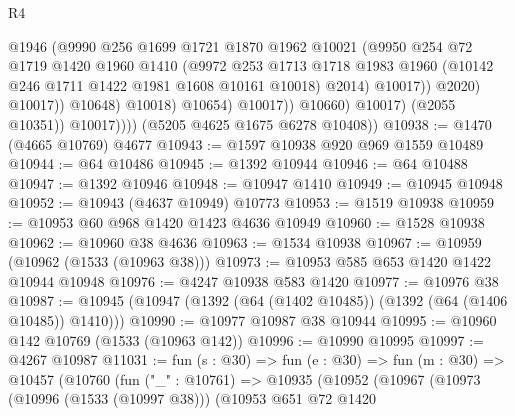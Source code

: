 \begin{lexlean}{R4}
\begin{coremodule}
                                    @1946
                                    (@9990
                                      @256
                                      @1699
                                      @1721
                                      @1870
                                      @1962
                                      @10021
                                      (@9950
                                        @254
                                        @72
                                        @1719
                                        @1420
                                        @1960
                                        @1410
                                        (@9972
                                          @253
                                          @1713
                                          @1718
                                          @1983
                                          @1960
                                          (@10142 @246 @1711 @1422 @1981 @1608 @10161 @10018)
                                          @2014)
                                        @10017))
                                    @2020)
                                  @10017))
                              @10648)
                            @10018)
                          @10654)
                        @10017))
                    @10660)
                  @10017)
                (@2055 @10351))
              @10017))))
      (@5205 @4625 @1675 @6278 @10408))
@10938 := @1470 (@4665 @10769) @4677
@10943 := @1597 @10938 @920 @969 @1559 @10489
@10944 := @64 @10486
@10945 := @1392 @10944
@10946 := @64 @10488
@10947 := @1392 @10946
@10948 := @10947 @1410
@10949 := @10945 @10948
@10952 := @10943 (@4637 @10949) @10773
@10953 := @1519 @10938
@10959 := @10953 @60 @968 @1420 @1423 @4636 @10949
@10960 := @1528 @10938
@10962 := @10960 @38 @4636
@10963 := @1534 @10938
@10967 := @10959 (@10962 (@1533 (@10963 @38)))
@10973 := @10953 @585 @653 @1420 @1422 @10944 @10948
@10976 := @4247 @10938 @583 @1420
@10977 := @10976 @38
@10987 := @10945 (@10947 (@1392 (@64 (@1402 @10485)) (@1392 (@64 (@1406 @10485)) @1410)))
@10990 := @10977 @10987 @38 @10944
@10995 := @10960 @142 @10769 (@1533 (@10963 @142))
@10996 := @10990 @10995
@10997 := @4267 @10987
@11031 := fun (s : @30) =>
  fun (e : @30) =>
  fun (m : @30) =>
  @10457
    (@10760
      (fun ("_" : @10761) =>
      @10935
        (@10952
          (@10967
            (@10973
              (@10996 (@1533 (@10997 @38)))
              (@10953
                @651
                @72
                @1420

\end{coremodule}
\end{lexlean}
